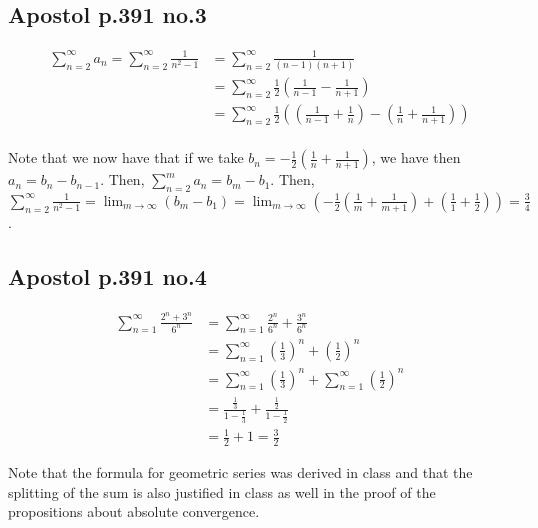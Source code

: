 \documentclass[12pt,letterpaper]{article}
\theoremstyle{definition}
\begin{document}
\subsection*{Apostol p.391 no.3}

\begin{align*}
  \sum_{n = 2}^\infty a_n = \sum_{n = 2}^\infty \frac{1}{n^2 - 1} &= \sum_{n = 2}^\infty \frac{1}{(n-1)(n+1)} \\
                                                                  &= \sum_{n = 2}^\infty \frac{1}{2}(\frac{1}{n-1} - \frac{1}{n+1}) \\
                                                                  &= \sum_{n=2}^\infty\frac{1}{2} ((\frac{1}{n-1} + \frac{1}{n}) - (\frac{1}{n} + \frac{1}{n+1})) \\
\end{align*}

Note that we now have that if we take $b_n = -\frac{1}{2}(\frac{1}{n} + \frac{1}{n+1})$, we
have then $a_n = b_n - b_{n-1}$. Then, $\sum_{n=2}^m a_n = b_m - b_1$. Then,
$\sum_{n=2}^\infty \frac{1}{n^2 - 1} = \lim_{m\rightarrow \infty} (b_m - b_1) = \lim_{m\rightarrow
  \infty} (-\frac{1}{2}(\frac{1}{m} + \frac{1}{m+1}) + (\frac{1}{1} + \frac{1}{2})) = \frac{3}{4}$.

\subsection*{Apostol p.391 no.4}

\begin{align*}
  \sum_{n=1}^\infty \frac{2^n + 3^n}{6^n} &= \sum_{n=1}^\infty \frac{2^n}{6^n} + \frac{3^n}{6^n} \\
                                          &= \sum_{n=1}^\infty (\frac{1}{3})^n + (\frac{1}{2})^n \\
                                          &= \sum_{n=1}^\infty (\frac{1}{3})^n + \sum_{n=1}^\infty(\frac{1}{2})^n \\
                                          &= \frac{\frac{1}{3}}{1 - \frac{1}{3}} + \frac{\frac{1}{2}}{1 - \frac{1}{2}} \\
                                          &= \frac{1}{2} + 1 = \frac{3}{2}
\end{align*}

Note that the formula for geometric series was derived in class and that the
splitting of the sum is also justified in class as well in the proof of the
propositions about absolute convergence.
\end{document}
